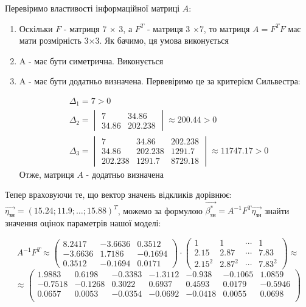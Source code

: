 \documentclass[a5paper, 20pt]{article}
\begin{document}
Перевіримо властивості інформаційної матриці $A$:

\begin{enumerate}
\item Оскільки $F$ - матриця  7 $\times$ 3, а $F^T$ - матриця 3 $\times$7, то матриця $A = F^T F$ має мати розмірність 3$\times$3. Як бачимо, ця умова виконується

\item A - має бути симетрична. Виконується

\item A - має бути додатньо визначена. Первевіримо це за критерієм Сильвестра:

$$
\begin{aligned}
&\Delta_1 = 7 > 0 \\
%
& \Delta_2 = 
\begin{vmatrix}
7 & 34.86  \\
34.86 & 202.238
\end{vmatrix} \approx 200.44 >0 \\
%
& \Delta_3 = 
\begin{vmatrix}
7 & 34.86 & 202.238 \\
34.86 & 202.238 & 1291.7 \\
202.238 &  1291.7 & 8729.18
\end{vmatrix} \approx 11747.17 >0 
\end{aligned}  
$$
Отже, матриця $A$ - додатньо визначена
\end{enumerate}

Тепер враховуючи те, що вектор значень відкликів дорівнює: $\vec{\eta_{\text{зн}}} = (15.24; 11.9; \dots ; 15.88)^T$, можемо за формулою $\vec{\beta^{*}_{\text{зн}}} = A^{-1}F^T\vec{\eta_{\text{зн}}}$ знайти значення оцінок параметрів нашої моделі:

$$
A^{-1}F^T \approx
\begin{pmatrix}
8.2417 & -3.6636 & 0.3512 \\
-3.6636 & 1.7186 & -0.1694 \\
0.3512 & -0.1694 & 0.0171 
\end{pmatrix}
\cdot
\begin{pmatrix}
1 & 1 & \cdots & 1 \\ 
2.15   & 2.87 & \cdots  &  7.83 \\
2.15^2   & 2.87^2 & \cdots &  7.83^2
\end{pmatrix}
\approx $$ $$ \approx
\begin{pmatrix}
 1.9883 &  0.6198 & -0.3383 & -1.3112 & -0.938 & -0.1065 &  1.0859 \\
-0.7518 & -0.1268 & 0.3022 & 0.6937 & 0.4593 & 0.0179 & -0.5946 \\
0.0657 & 0.0053 & -0.0354 & -0.0692 & -0.0418 &  0.0055 &  0.0698 \\
\end{pmatrix}
$$
\end{document}
